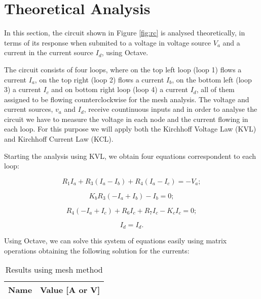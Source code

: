 \section{Theoretical Analysis}
\label{sec:analysis}

In this section, the circuit shown in Figure \ref{fig:rc} is analysed
theoretically, in terms of its response when submited to a voltage in
voltage source $V_a$ and a current in the current source $I_d$, using
Octave.

The circuit consists of four loops, where on the top left loop (loop 1) flows a current $I_a$,
on the top right (loop 2) flows a current $I_b$, on the bottom left (loop 3) a current $I_c$
and on bottom right loop (loop 4) a current $I_d$, all of them assigned to be flowing counterclockwise for
the mesh analysis. The voltage and current sources, $v_a$ and $I_d$, receive countinuous inputs and in order to analyse the circuit
we have to measure the voltage in each node and the current flowing in each loop.
For this purpose we will apply both the Kirchhoff Voltage Law (KVL) and Kirchhoff
Current Law (KCL). \par
Starting the analysis using KVL, we obtain four equations correspondent to each loop:

\begin{equation}
  R_1I_a + R_3(I_a - I_b) + R_4(I_a - I_c) = -V_a ;
  \label{eq:kvl1}
\end{equation}

\begin{equation}
  K_bR_3(-I_a + I_b) - I_b = 0;
  \label{eq:kvl2}
\end{equation}

\begin{equation}
  R_4(-I_a + I_c) + R_6I_c + R_7I_c - K_cI_c = 0;
  \label{eq:kvl3}
\end{equation}

\begin{equation}
  I_d = I_d.
  \label{eq:kvl4}
\end{equation}

Using Octave, we can solve this system of equations easily using matrix operations obtaining the following
solution for the currents:

\begin{table}[h]
  \centering
  \begin{tabular}{|l|r|}
    \hline    
    {\bf Name} & {\bf Value [A or V]} \\ \hline
    
  \end{tabular}
  \caption{Results using mesh method}
  \label{tab:tabela1}
\end{table}

